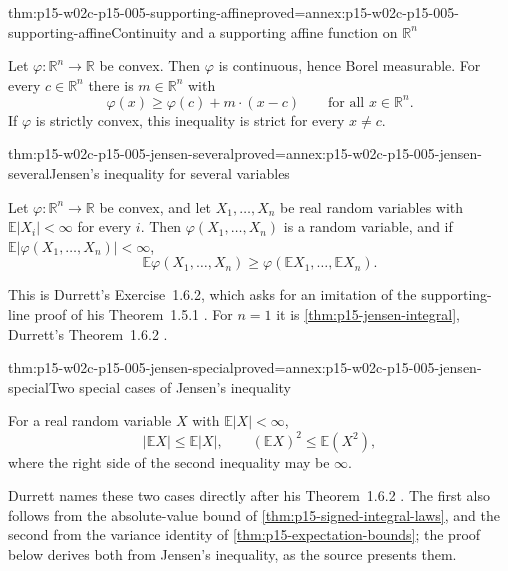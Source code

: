 \begin{hblemma}{thm:p15-w02c-p15-005-supporting-affine}{proved=annex:p15-w02c-p15-005-supporting-affine}{Continuity and a supporting affine function on \(\mathbb R^n\)}
\par\nobreak
Let \(\varphi:\mathbb R^n\to\mathbb R\) be convex. Then \(\varphi\) is
continuous, hence Borel measurable. For every \(c\in\mathbb R^n\) there
is \(m\in\mathbb R^n\) with
\[
 \varphi(x)\geq\varphi(c)+m\cdot(x-c)\qquad\text{for all }x\in\mathbb R^n .
\]
If \(\varphi\) is strictly convex, this inequality is strict for every
\(x\neq c\).
\end{hblemma}

\begin{hbtheorem}{thm:p15-w02c-p15-005-jensen-several}{proved=annex:p15-w02c-p15-005-jensen-several}{Jensen's inequality for several variables}
\par\nobreak
Let \(\varphi:\mathbb R^n\to\mathbb R\) be convex, and let
\(X_1,\ldots,X_n\) be real random variables with
\(\mathbb E|X_i|<\infty\) for every \(i\). Then
\(\varphi(X_1,\ldots,X_n)\) is a random variable, and if
\(\mathbb E|\varphi(X_1,\ldots,X_n)|<\infty\),
\[
 \mathbb E\varphi(X_1,\ldots,X_n)\geq
 \varphi(\mathbb EX_1,\ldots,\mathbb EX_n).
\]
\end{hbtheorem}

This is Durrett's Exercise~1.6.2, which asks for an imitation of the
supporting-line proof of his Theorem~1.5.1
\cite[pp.~25, 35]{DurrettPTEAuthor2019}. For \(n=1\) it is
\cref{thm:p15-jensen-integral}, Durrett's Theorem~1.6.2
\cite[p.~29]{DurrettPTEAuthor2019}.

\begin{hbcorollary}{thm:p15-w02c-p15-005-jensen-special}{proved=annex:p15-w02c-p15-005-jensen-special}{Two special cases of Jensen's inequality}
\par\nobreak
For a real random variable \(X\) with \(\mathbb E|X|<\infty\),
\[
 |\mathbb EX|\leq\mathbb E|X|,
 \qquad
 (\mathbb EX)^2\leq\mathbb E(X^2),
\]
where the right side of the second inequality may be \(\infty\).
\end{hbcorollary}

Durrett names these two cases directly after his Theorem~1.6.2
\cite[p.~29]{DurrettPTEAuthor2019}. The first also follows from the
absolute-value bound of \cref{thm:p15-signed-integral-laws}, and the
second from the variance identity of \cref{thm:p15-expectation-bounds};
the proof below derives both from Jensen's inequality, as the source
presents them.

